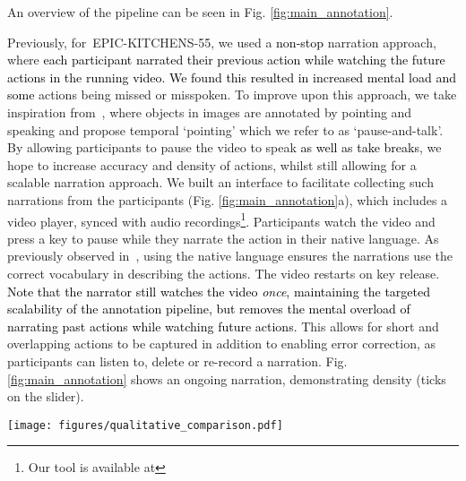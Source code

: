 \documentclass[twocolumn]{svjour3}          \smartqed
\newcommand{\chParagraph}[1]{\noindent {\textbf{#1.}} \hspace{6pt}}
\newcommand{\edits}[1]{\textcolor{black}{#1}}
\newcommand {\oldDataset} {EPIC-KITCHENS-55{}}
\newcommand{\annStyle} {`pause-and-talk'{}}
\begin{document}
\chParagraph{Annotation Pipeline} An overview of the pipeline can be seen in Fig. \ref{fig:main_annotation}.


\chParagraph{(a) Narrator}
Previously, for~\oldDataset, we used a \edits{non-stop} narration approach, where 
\edits{each participant narrated their previous action while watching the future actions in the running video. We found this resulted in increased mental load and some}
actions being missed or misspoken.
To improve upon this approach, we take inspiration from~\cite{Gigli2019}, where
objects in images are annotated by pointing and speaking and propose temporal `pointing' which we refer to as \annStyle.
By allowing participants to pause the video to speak  \edits{as well as take breaks}, we hope to increase accuracy and density of actions, whilst still allowing for a scalable narration approach.
We built an interface to facilitate collecting such narrations from the participants (Fig. \ref{fig:main_annotation}a), which includes a video player, synced with audio recordings\footnote{Our tool is available at }. Participants watch the video and press a key to pause while they narrate the action in their native language.
As previously observed in~\cite{Damen2018EPICKITCHENS}, using the native language ensures the narrations use the correct vocabulary in describing the actions.
The video restarts on key release.
\edits{Note that the narrator still watches the video \emph{once}, maintaining the targeted scalability of the annotation pipeline, but removes the mental overload of narrating past actions while watching future actions.}
This allows for short and overlapping actions to be captured in addition to enabling error correction, as participants can listen to, delete or re-record a narration.
Fig. \ref{fig:main_annotation} shows an ongoing narration, demonstrating density (ticks on the slider). 

\begin{figure*}[t!]
    \centering
    \texttt{[image: figures/qualitative\_comparison.pdf]}
    \caption{Comparing \edits{non-stop} narrations (blue) to \annStyle{} narrations (red). Right: timestamps (dots) and segments (bars) for two sample sequences. \annStyle{} captures all actions including short ones. Black frames depict missed actions.}
    \label{fig:qual_comp_18_20}
\end{figure*}
\end{document}
